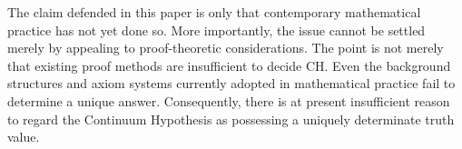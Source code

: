 \documentclass[11pt,a4paper]{article}
\begin{document}
The claim defended in this paper is only that contemporary mathematical practice has not yet done so. More importantly, the issue cannot be settled merely by appealing to proof-theoretic considerations. The point is not merely that existing proof methods are insufficient to decide CH. Even the background structures and axiom systems currently adopted in mathematical practice fail to determine a unique answer. Consequently, there is at present insufficient reason to regard the Continuum Hypothesis as possessing a uniquely determinate truth value.

\printbibliography
\end{document}
